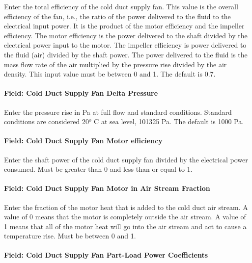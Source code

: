Enter the total efficiency of the cold duct supply fan. This value is the overall efficiency of the fan, i.e., the ratio of the power delivered to the fluid to the electrical input power. It is the product of the motor efficiency and the impeller efficiency. The motor efficiency is the power delivered to the shaft divided by the electrical power input to the motor. The impeller efficiency is power delivered to the fluid (air) divided by the shaft power. The power delivered to the fluid is the mass flow rate of the air multiplied by the pressure rise divided by the air density. This input value must be between 0 and 1. The default is 0.7.

\paragraph{Field: Cold Duct Supply Fan Delta Pressure}\label{field-cold-duct-supply-fan-delta-pressure}

Enter the pressure rise in Pa at full flow and standard conditions. Standard conditions are considered 20\(^{o}\) C at sea level, 101325 Pa. The default is 1000 Pa.

\paragraph{Field: Cold Duct Supply Fan Motor efficiency}\label{field-cold-duct-supply-fan-motor-efficiency}

Enter the shaft power of the cold duct supply fan divided by the electrical power consumed. Must be greater than 0 and less than or equal to 1.

\paragraph{Field: Cold Duct Supply Fan Motor in Air Stream Fraction}\label{field-cold-duct-supply-fan-motor-in-air-stream-fraction}

Enter the fraction of the motor heat that is added to the cold duct air stream. A value of 0 means that the motor is completely outside the air stream. A value of 1 means that all of the motor heat will go into the air stream and act to cause a temperature rise. Must be between 0 and 1.

\paragraph{Field: Cold Duct Supply Fan Part-Load Power Coefficients}\label{field-cold-duct-supply-fan-part-load-power-coefficients}


